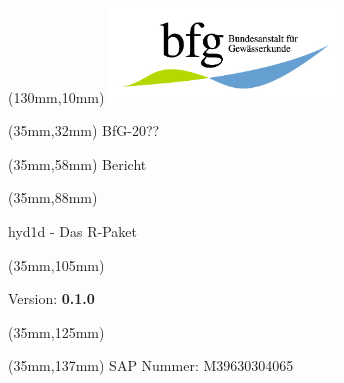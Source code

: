 \begin{titlepage}
    \begin{textblock*}{50mm}(130mm,10mm)
    \includegraphics[width=6cm]{latex/bfg_logo.jpg} %
    \end{textblock*}

    \begin{textblock*}{150mm}(35mm,32mm)
    \huge\noindent
    BfG-20??
    \end{textblock*}

    \begin{textblock*}{150mm}(35mm,58mm)
    \fontsize{30}{35}\selectfont\noindent
    Bericht
    \end{textblock*}

    \begin{textblock*}{150mm}(35mm,88mm)
    \fontsize{20}{25}\selectfont\noindent
    \begin{center}
    hyd1d - Das R-Paket
    \end{center}
    \end{textblock*}

    \begin{textblock*}{150mm}(35mm,105mm)
    \fontsize{15}{17}\selectfont\noindent
    \begin{center}
    Version: \textbf{0.1.0}
    \end{center}
    \end{textblock*}

    \begin{textblock*}{150mm}(35mm,125mm)
    \fontsize{15}{17}\selectfont\noindent
    \mytoday
    \end{textblock*}


    \begin{textblock*}{150mm}(35mm,137mm)
    \fontsize{15}{17}\selectfont\noindent
    SAP Nummer: M39630304065
    \end{textblock*}


\end{titlepage}
